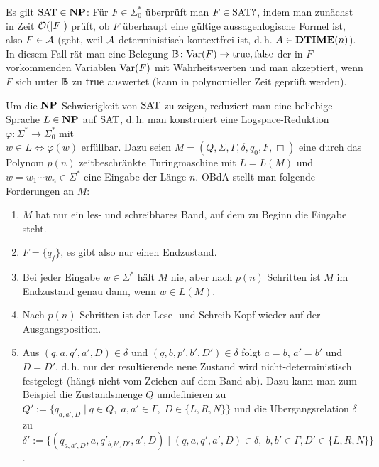 \begin{Beweis}
    Es gilt $\text{SAT} \in \mathbf{NP}$:
    Für $F \in \Sigma_0^\ast$ überprüft man $F \in \text{SAT}?$, indem man zunächst in Zeit $\mathcal{O}(|F|)$
    prüft, ob $F$ überhaupt eine gültige aussagenlogische Formel ist, also $F \in \mathcal{A}$
    (geht, weil $\mathcal{A}$ deterministisch kontextfrei ist, d.\,h. $A \in \mathbf{DTIME}(n)$).
    In diesem Fall rät man eine Belegung $\mathbb{B}\colon \text{Var}(F) \rightarrow {\ensuremath{\text{true}}, \ensuremath{\text{false}}}$
    der in $F$ vorkommenden Variablen $\text{Var}(F)$ mit Wahrheitswerten
    und man akzeptiert, wenn $F$ sich unter $\mathbb{B}$ zu $\text{true}$ auswertet
    (kann in polynomieller Zeit geprüft werden).

    Um die $\mathbf{NP}$-Schwierigkeit von $\text{SAT}$ zu zeigen,
    reduziert man eine beliebige Sprache $L \in \mathbf{NP}$ auf $\text{SAT}$, d.\,h.
    man konstruiert eine Logspace-Reduktion
    $\varphi\colon \Sigma^\ast \rightarrow \Sigma_0^\ast$ mit\\
    $w \in L \iff \varphi(w) \text{ erfüllbar}$.
    Dazu seien $M = (Q, \Sigma, \Gamma, \delta, q_0, F, \Box)$ eine durch das Polynom $p(n)$
    zeitbeschränkte Turingmaschine mit $L = L(M)$
    und $w = w_1 \dotsb w_n \in \Sigma^\ast$ eine Eingabe der Länge $n$.
    OBdA stellt man folgende Forderungen an $M$:
    \begin{enumerate}
        \item
        $M$ hat nur ein les- und schreibbares Band, auf dem zu Beginn die Eingabe steht.

        \item
        $F = \{q_f\}$, es gibt also nur einen Endzustand.

        \item
        Bei jeder Eingabe $w \in \Sigma^\ast$ hält $M$ nie, aber nach $p(n)$ Schritten ist $M$
        im Endzustand genau dann, wenn $w \in L(M)$.

        \item
        Nach $p(n)$ Schritten ist der Lese- und Schreib-Kopf wieder auf der Ausgangsposition.

        \item
        Aus $(q, a, q', a', D) \in \delta$ und $(q, b, p', b', D') \in \delta$ folgt
        $a = b$, $a' = b'$ und $D = D'$,
        d.\,h. nur der resultierende neue Zustand wird nicht-deterministisch festgelegt
        (hängt nicht vom Zeichen auf dem Band ab).
        Dazu kann man zum Beispiel die Zustandsmenge $Q$ umdefinieren zu
        $Q' := \{q_{a,a',D} \;|\; q \in Q,\; a, a' \in \Gamma,\;
        D \in \{L, R, N\}\}$
        und die Übergangsrelation $\delta$ zu\\
        $\delta' := \{(q_{a,a',D}, a, q'_{b,b',D'}, a', D) \;|\; (q, a, q', a', D) \in \delta,\;
        b, b' \in \Gamma, D' \in \{L, R, N\}\}$.
    \end{enumerate}


\end{Beweis}

